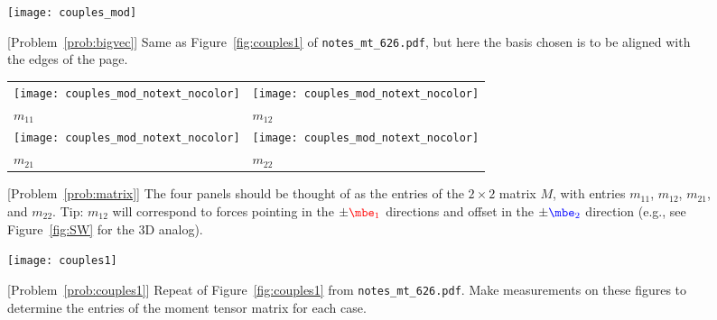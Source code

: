 \documentclass[11pt,titlepage,fleqn]{article}
\newcommand{\mtfile}{\texttt{notes\_mt\_626.pdf}}
\newcommand{\eone}{\textcolor{red}{\mbe_1}}
\newcommand{\etwo}{\textcolor{blue}{\mbe_2}}
\begin{document}



\begin{figure}
\centering
\texttt{[image: couples\_mod]}
\caption{
[Problem~\ref{prob:bigvec}] Same as Figure~\ref{fig:couples1} of \mtfile, but here the basis chosen is to be aligned with the edges of the page.
\label{fig:template}
}
\end{figure}


\begin{figure}
\centering
\begin{tabular}{|l|l|}
\hline
\texttt{[image: couples\_mod\_notext\_nocolor]} & 
\texttt{[image: couples\_mod\_notext\_nocolor]} \\
$m_{11}$ & $m_{12}$ \\ \hline
\texttt{[image: couples\_mod\_notext\_nocolor]} &
\texttt{[image: couples\_mod\_notext\_nocolor]} \\
$m_{21}$ & $m_{22}$ \\ \hline
\end{tabular}
\caption{
[Problem~\ref{prob:matrix}] 
The four panels should be thought of as the entries of the $2 \times 2$ matrix $M$, with entries $m_{11}$, $m_{12}$, $m_{21}$, and $m_{22}$.
Tip: $m_{12}$ will correspond to forces pointing in the $\pm\eone$ directions and offset in the $\pm\etwo$ direction (e.g., see Figure~\ref{fig:SW} for the 3D analog).
\label{fig:template4}
}
\end{figure}

\begin{figure}
\hspace{-1cm}
\texttt{[image: couples1]}
\caption{
[Problem~\ref{prob:couples1}] Repeat of Figure~\ref{fig:couples1} from \mtfile.
Make measurements on these figures to determine the entries of the moment tensor matrix for each case.
\label{fig:template_couples1}
}
\end{figure}
\end{document}
